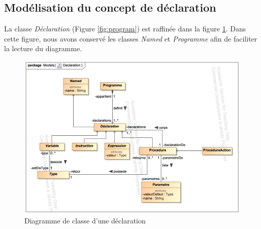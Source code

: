 
\subsection{Modélisation du concept de déclaration}
\label{sec:question7}

La classe \emph{Déclaration} (Figure \ref{fig:program}) est raffinée dans la figure \ref{fig:declaration}. Dans cette figure, nous avons conservé les classes \emph{Named} et \emph{Programme} afin de faciliter la lecture du diagramme.

\begin{figure}
	\centering
	\includegraphics[width=500pt]{assets/class__Declaration}
	\caption{Diagramme de classe d'une déclaration}
	\label{fig:declaration}
\end{figure}



